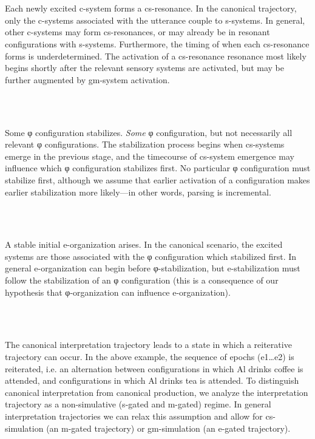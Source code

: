 \ea%
    \label{ex:key:2}
    \gll\\
        \\
    \glt
    \z

         Each newly excited c-system forms a cs-resonance. In the canonical trajectory, only the c-systems associated with the utterance couple to s-systems. In general, other c-systems may form cs-resonances, or may already be in resonant configurations with s-systems. Furthermore, the timing of when each cs-resonance forms is underdetermined. The activation of a cs-resonance resonance most likely begins shortly after the relevant sensory systems are activated, but may be further augmented by gm-system activation.

\ea%
    \label{ex:key:3}
    \gll\\
        \\
    \glt
    \z

         Some φ configuration stabilizes. \textit{Some} φ configuration, but not necessarily all relevant φ configurations. The stabilization process begins when cs-systems emerge in the previous stage, and the timecourse of cs-system emergence may influence which φ configuration stabilizes first. No particular φ configuration must stabilize first, although we assume that earlier activation of a configuration makes earlier stabilization more likely—in other words, parsing is incremental. 

\ea%
    \label{ex:key:4}
    \gll\\
        \\
    \glt
    \z

         A stable initial e-organization arises. In the canonical scenario, the excited systems are those associated with the φ configuration which stabilized first. In general e-organization can begin before φ-stabilization, but e-stabilization must follow the stabilization of an φ configuration (this is a consequence of our hypothesis that φ-organization can influence e-organization). 

\ea%
    \label{ex:key:5}
    \gll\\
        \\
    \glt
    \z

         The canonical interpretation trajectory leads to a state in which a reiterative trajectory can occur. In the above example, the sequence of epochs (e1…e2) is reiterated, i.e. an alternation between configurations in which {\textbar}Al drinks coffee{\textbar} is attended, and configurations in which {\textbar}Al drinks tea{\textbar} is attended. To distinguish canonical interpretation from canonical production, we analyze the interpretation trajectory as a non-simulative (s-gated and m-gated) regime. In general interpretation trajectories we can relax this assumption and allow for cs-simulation (an m-gated trajectory) or gm-simulation (an e-gated trajectory).

